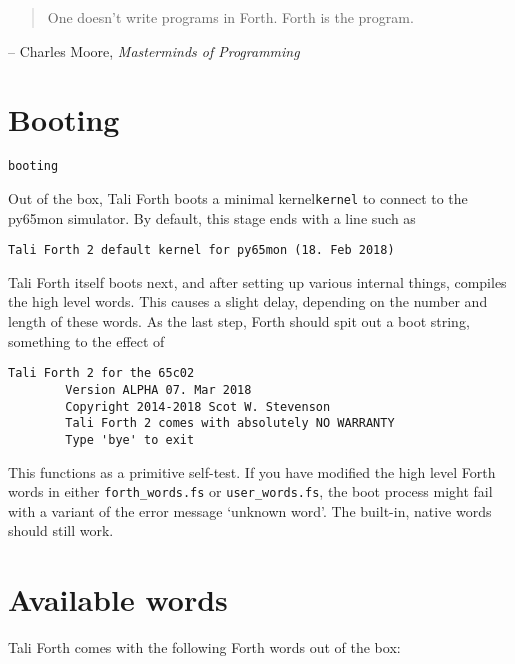 
\begin{quote}
	One doesn't write programs in Forth. Forth is the program.
\end{quote}
\begin{flushright}
        -- Charles Moore, \textit{Masterminds of Programming}\cite{biancuzzi09}
\end{flushright}

\section{Booting}\texttt{booting}

Out of the box, Tali Forth boots a minimal kernel\texttt{kernel}
to connect to the py65mon simulator. By default, this stage ends
with a line such as

\begin{lstlisting}[frame=lines]
        Tali Forth 2 default kernel for py65mon (18. Feb 2018)
\end{lstlisting}

\noindent Tali Forth itself boots next, and after setting up various internal
things, compiles the high level words. This causes a slight delay, depending on
the number and length of these words. As the last step, Forth should spit out a
boot string, something to the effect of

\begin{lstlisting}[frame=lines]
        Tali Forth 2 for the 65c02
        Version ALPHA 07. Mar 2018 
        Copyright 2014-2018 Scot W. Stevenson
        Tali Forth 2 comes with absolutely NO WARRANTY
        Type 'bye' to exit
\end{lstlisting}

\noindent This functions as a primitive self-test. If you have modified the high
level Forth words in either \texttt{forth\_words.fs} or
\texttt{user\_words.fs}, the boot process might fail with a variant of the error
message `unknown word'. The built-in, native words should still work.

\section{Available words}

Tali Forth comes with the following Forth words out of the
box:


